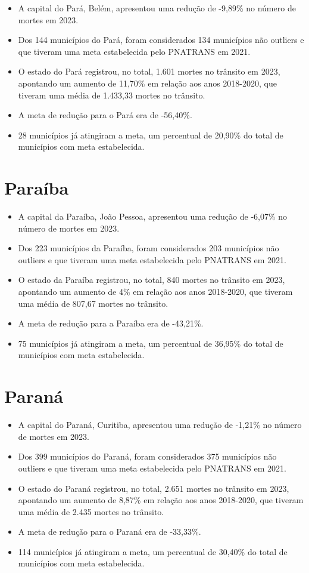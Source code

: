 \documentclass[
  letterpaper,
  DIV=11,
  numbers=noendperiod]{scrreprt}
\begin{document}
\begin{itemize}
\item
  A capital do Pará, Belém, apresentou uma redução de -9,89\% no número
  de mortes em 2023.
\item
  Dos 144 municípios do Pará, foram considerados 134 municípios não
  outliers e que tiveram uma meta estabelecida pelo PNATRANS em 2021.
\item
  O estado do Pará registrou, no total, 1.601 mortes no trânsito em
  2023, apontando um aumento de 11,70\% em relação aos anos 2018-2020,
  que tiveram uma média de 1.433,33 mortes no trânsito.
\item
  A meta de redução para o Pará era de -56,40\%.
\item
  28 municípios já atingiram a meta, um percentual de 20,90\% do total
  de municípios com meta estabelecida.
\end{itemize}

\section{Paraíba}\label{parauxedba}

\begin{itemize}
\item
  A capital da Paraíba, João Pessoa, apresentou uma redução de -6,07\%
  no número de mortes em 2023.
\item
  Dos 223 municípios da Paraíba, foram considerados 203 municípios não
  outliers e que tiveram uma meta estabelecida pelo PNATRANS em 2021.
\item
  O estado da Paraíba registrou, no total, 840 mortes no trânsito em
  2023, apontando um aumento de 4\% em relação aos anos 2018-2020, que
  tiveram uma média de 807,67 mortes no trânsito.
\item
  A meta de redução para a Paraíba era de -43,21\%.
\item
  75 municípios já atingiram a meta, um percentual de 36,95\% do total
  de municípios com meta estabelecida.
\end{itemize}

\section{Paraná}\label{paranuxe1}

\begin{itemize}
\item
  A capital do Paraná, Curitiba, apresentou uma redução de -1,21\% no
  número de mortes em 2023.
\item
  Dos 399 municípios do Paraná, foram considerados 375 municípios não
  outliers e que tiveram uma meta estabelecida pelo PNATRANS em 2021.
\item
  O estado do Paraná registrou, no total, 2.651 mortes no trânsito em
  2023, apontando um aumento de 8,87\% em relação aos anos 2018-2020,
  que tiveram uma média de 2.435 mortes no trânsito.
\item
  A meta de redução para o Paraná era de -33,33\%.
\item
  114 municípios já atingiram a meta, um percentual de 30,40\% do total
  de municípios com meta estabelecida.
\end{itemize}
\end{document}
